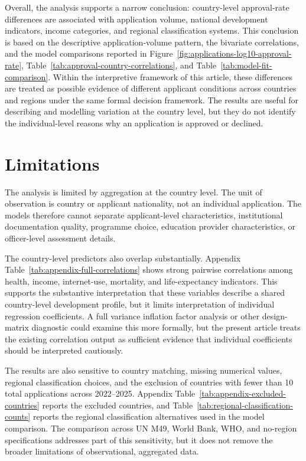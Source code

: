 \documentclass[runningheads]{llncs}
\begin{document}
Overall, the analysis supports a narrow conclusion: country-level approval-rate differences are associated with application volume, national development indicators, income categories, and regional classification systems. This conclusion is based on the descriptive application-volume pattern, the bivariate correlations, and the model comparisons reported in Figure~\ref{fig:applications-log10-approval-rate}, Table~\ref{tab:approval-country-correlations}, and Table~\ref{tab:model-fit-comparison}. Within the interpretive framework of this article, these differences are treated as possible evidence of different applicant conditions across countries and regions under the same formal decision framework. The results are useful for describing and modelling variation at the country level, but they do not identify the individual-level reasons why an application is approved or declined.

\section{Limitations}

The analysis is limited by aggregation at the country level. The unit of observation is country or applicant nationality, not an individual application. The models therefore cannot separate applicant-level characteristics, institutional documentation quality, programme choice, education provider characteristics, or officer-level assessment details.

The country-level predictors also overlap substantially. Appendix Table~\ref{tab:appendix-full-correlations} shows strong pairwise correlations among health, income, internet-use, mortality, and life-expectancy indicators. This supports the substantive interpretation that these variables describe a shared country-level development profile, but it limits interpretation of individual regression coefficients. A full variance inflation factor analysis or other design-matrix diagnostic could examine this more formally, but the present article treats the existing correlation output as sufficient evidence that individual coefficients should be interpreted cautiously.

The results are also sensitive to country matching, missing numerical values, regional classification choices, and the exclusion of countries with fewer than 10 total applications across 2022--2025. Appendix Table~\ref{tab:appendix-excluded-countries} reports the excluded countries, and Table~\ref{tab:regional-classification-counts} reports the regional classification alternatives used in the model comparison. The comparison across UN M49, World Bank, WHO, and no-region specifications addresses part of this sensitivity, but it does not remove the broader limitations of observational, aggregated data.
\end{document}
